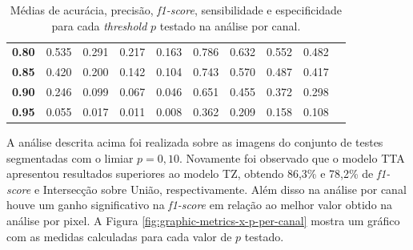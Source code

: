 \begin{table}[h]
\begin{small}
\begin{tabular}{|l|l|l|l|l|l|l|l|l|l|}
\cellcolor[HTML]{EFEFEF}\textbf{0.80}   &  \cellcolor[HTML]{FFEEEE}0.535               & \cellcolor[HTML]{FFEEEE}0.291              & \cellcolor[HTML]{FFEEEE}0.217                     & \cellcolor[HTML]{FFEEEE}0.163              &  \cellcolor[HTML]{EEFFEE}0.786               & \cellcolor[HTML]{EEFFEE}0.632              & \cellcolor[HTML]{EEFFEE}0.552                    & \cellcolor[HTML]{EEFFEE}0.482              \\ \cline{1-9}
\cellcolor[HTML]{EFEFEF}\textbf{0.85}   &  \cellcolor[HTML]{FFEEEE}0.420               & \cellcolor[HTML]{FFEEEE}0.200              & \cellcolor[HTML]{FFEEEE}0.142                     & \cellcolor[HTML]{FFEEEE}0.104              &  \cellcolor[HTML]{EEFFEE}0.743               & \cellcolor[HTML]{EEFFEE}0.570              & \cellcolor[HTML]{EEFFEE}0.487                    & \cellcolor[HTML]{EEFFEE}0.417              \\ \cline{1-9}
\cellcolor[HTML]{EFEFEF}\textbf{0.90}   &  \cellcolor[HTML]{FFEEEE}0.246               & \cellcolor[HTML]{FFEEEE}0.099              & \cellcolor[HTML]{FFEEEE}0.067                     & \cellcolor[HTML]{FFEEEE}0.046              &  \cellcolor[HTML]{EEFFEE}0.651               & \cellcolor[HTML]{EEFFEE}0.455              & \cellcolor[HTML]{EEFFEE}0.372                    & \cellcolor[HTML]{EEFFEE}0.298              \\ \cline{1-9}
\cellcolor[HTML]{EFEFEF}\textbf{0.95}   &  \cellcolor[HTML]{FFEEEE}0.055               & \cellcolor[HTML]{FFEEEE}0.017              & \cellcolor[HTML]{FFEEEE}0.011                     & \cellcolor[HTML]{FFEEEE}0.008              &  \cellcolor[HTML]{EEFFEE}0.362               & \cellcolor[HTML]{EEFFEE}0.209              & \cellcolor[HTML]{EEFFEE}0.158                    & \cellcolor[HTML]{EEFFEE}0.108              \\ \cline{1-9}
\end{tabular}
\end{small}
\caption{Médias de acurácia, precisão, \textit{f1-score}, sensibilidade e especificidade para cada \textit{threshold} $p$ testado na análise por canal.}
    \label{tab:metricas-variando-p-por-canal}
\end{table}

A análise descrita acima foi realizada sobre as imagens do conjunto de testes segmentadas com o limiar \(p = 0,10\). Novamente foi observado que o modelo \acs{TTA} apresentou resultados superiores ao modelo \acs{TZ}, obtendo 86,3\% e 78,2\% de \textit{f1-score} e Intersecção sobre União, respectivamente. Além disso na análise por canal houve um ganho significativo na \textit{f1-score} em relação ao melhor valor obtido na análise por pixel. A Figura \ref{fig:graphic-metrics-x-p-per-canal} mostra um gráfico com as medidas calculadas para cada valor de $p$ testado.

